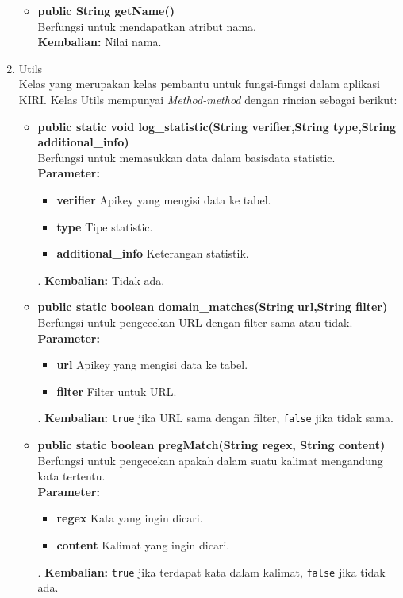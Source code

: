 \begin{enumerate}
\begin{itemize}
		\item \textbf{public String getName()}\\
		Berfungsi untuk mendapatkan atribut nama.\\
		\textbf{Kembalian:}  Nilai nama.
	\end{itemize}
	
	\item Utils\\
	Kelas yang merupakan kelas pembantu untuk fungsi-fungsi dalam aplikasi KIRI. Kelas Utils mempunyai \textit{Method-method} dengan rincian sebagai berikut:
	\begin{itemize}
	
		\item \textbf{public static void log\_statistic(String verifier,String type,String additional\_info)}\\
		Berfungsi untuk memasukkan data dalam basisdata statistic.\\
		\textbf{Parameter:}
				\begin{itemize}
					\item \textbf{verifier} Apikey yang mengisi data ke tabel.
					\item \textbf{type} Tipe statistic.
					\item \textbf{additional\_info} Keterangan statistik.
				\end{itemize}.
		\textbf{Kembalian:}  Tidak ada.
		
		\item \textbf{public static boolean domain\_matches(String url,String filter)}\\
		Berfungsi untuk pengecekan URL dengan filter sama atau tidak.\\
		\textbf{Parameter:}
				\begin{itemize}
					\item \textbf{url} Apikey yang mengisi data ke tabel.
					\item \textbf{filter} Filter untuk URL.
				\end{itemize}.
		\textbf{Kembalian:}  \texttt{true} jika URL sama dengan filter, \texttt{false} jika tidak sama.
	
		\item \textbf{public static boolean pregMatch(String regex, String content)}\\
		Berfungsi untuk pengecekan apakah dalam suatu kalimat mengandung kata tertentu.\\
		\textbf{Parameter:}
				\begin{itemize}
					\item \textbf{regex} Kata yang ingin dicari.
					\item \textbf{content} Kalimat yang ingin dicari.
				\end{itemize}.
		\textbf{Kembalian:}  \texttt{true} jika terdapat kata dalam kalimat, \texttt{false} jika tidak ada.
		

\end{itemize}
\end{enumerate}
